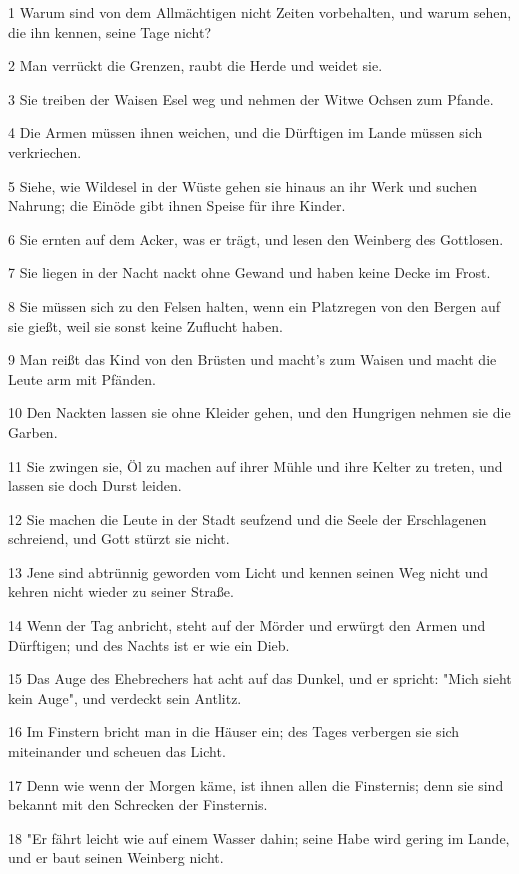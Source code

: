 \par 1 Warum sind von dem Allmächtigen nicht Zeiten vorbehalten, und warum sehen, die ihn kennen, seine Tage nicht?
\par 2 Man verrückt die Grenzen, raubt die Herde und weidet sie.
\par 3 Sie treiben der Waisen Esel weg und nehmen der Witwe Ochsen zum Pfande.
\par 4 Die Armen müssen ihnen weichen, und die Dürftigen im Lande müssen sich verkriechen.
\par 5 Siehe, wie Wildesel in der Wüste gehen sie hinaus an ihr Werk und suchen Nahrung; die Einöde gibt ihnen Speise für ihre Kinder.
\par 6 Sie ernten auf dem Acker, was er trägt, und lesen den Weinberg des Gottlosen.
\par 7 Sie liegen in der Nacht nackt ohne Gewand und haben keine Decke im Frost.
\par 8 Sie müssen sich zu den Felsen halten, wenn ein Platzregen von den Bergen auf sie gießt, weil sie sonst keine Zuflucht haben.
\par 9 Man reißt das Kind von den Brüsten und macht's zum Waisen und macht die Leute arm mit Pfänden.
\par 10 Den Nackten lassen sie ohne Kleider gehen, und den Hungrigen nehmen sie die Garben.
\par 11 Sie zwingen sie, Öl zu machen auf ihrer Mühle und ihre Kelter zu treten, und lassen sie doch Durst leiden.
\par 12 Sie machen die Leute in der Stadt seufzend und die Seele der Erschlagenen schreiend, und Gott stürzt sie nicht.
\par 13 Jene sind abtrünnig geworden vom Licht und kennen seinen Weg nicht und kehren nicht wieder zu seiner Straße.
\par 14 Wenn der Tag anbricht, steht auf der Mörder und erwürgt den Armen und Dürftigen; und des Nachts ist er wie ein Dieb.
\par 15 Das Auge des Ehebrechers hat acht auf das Dunkel, und er spricht: "Mich sieht kein Auge", und verdeckt sein Antlitz.
\par 16 Im Finstern bricht man in die Häuser ein; des Tages verbergen sie sich miteinander und scheuen das Licht.
\par 17 Denn wie wenn der Morgen käme, ist ihnen allen die Finsternis; denn sie sind bekannt mit den Schrecken der Finsternis.
\par 18 "Er fährt leicht wie auf einem Wasser dahin; seine Habe wird gering im Lande, und er baut seinen Weinberg nicht.
